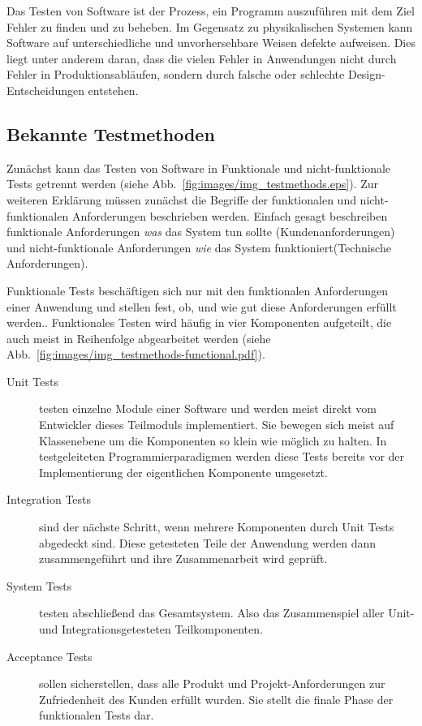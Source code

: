\documentclass[12pt,a4paper,bibliography=totocnumbered,listof=totocnumbered]{scrartcl}
\begin{document}
Das Testen von Software ist der Prozess, ein Programm auszuführen mit dem Ziel Fehler zu finden und zu beheben. Im Gegensatz zu physikalischen Systemen kann Software auf unterschiedliche und unvorhersehbare Weisen defekte aufweisen. Dies liegt unter anderem daran, dass die vielen Fehler in Anwendungen nicht durch Fehler in Produktionsabläufen, sondern durch falsche oder schlechte Design-Entscheidungen entstehen.\cite{pantesting}

\subsection{Bekannte Testmethoden}\label{ch:soft-test}

Zunächst kann das Testen von Software in Funktionale und nicht-funktionale Tests getrennt werden (siehe Abb.~\ref{fig:images/img_testmethods.eps}). Zur weiteren Erklärung müssen zunächst die Begriffe der funktionalen und nicht-funktionalen Anforderungen beschrieben werden. Einfach gesagt beschreiben funktionale Anforderungen \textit{was} das System tun sollte (Kundenanforderungen) und nicht-funktionale Anforderungen \textit{wie} das System funktioniert(Technische Anforderungen).\cite{erikssonreq}


Funktionale Tests beschäftigen sich nur mit den funktionalen Anforderungen einer Anwendung und stellen fest, ob, und wie gut diese Anforderungen erfüllt werden.\cite{erikssontesting}. Funktionales Testen wird häufig in vier Komponenten aufgeteilt, die auch meist in Reihenfolge abgearbeitet werden (siehe Abb.~\ref{fig:images/img_testmethods-functional.pdf}).\cite{inflectra}

\begin{description}
	\item[Unit Tests] testen einzelne Module einer Software und werden meist direkt vom Entwickler dieses Teilmoduls implementiert. Sie bewegen sich meist auf Klassenebene um die Komponenten so klein  wie möglich zu halten. In testgeleiteten Programmierparadigmen werden diese Tests bereits vor der Implementierung der eigentlichen Komponente umgesetzt.\cite{inflectra}
	\item[Integration Tests] sind der nächste Schritt, wenn mehrere Komponenten durch Unit Tests abgedeckt sind. Diese getesteten Teile der Anwendung werden dann zusammengeführt und ihre Zusammenarbeit wird geprüft.\cite{inflectra}
	\item[System Tests] testen abschließend das Gesamtsystem. Also das Zusammenspiel aller Unit- und Integrationsgetesteten Teilkomponenten.\cite{inflectra}
	\item[Acceptance Tests] sollen sicherstellen, dass alle Produkt und Projekt-Anforderungen zur Zufriedenheit des Kunden erfüllt wurden. Sie stellt die finale Phase der funktionalen Tests dar.\cite{inflectra}
\end{description}
\end{document}
